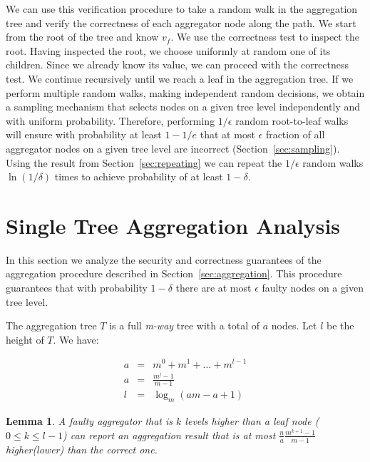 \documentclass{article}
\newtheorem{lem}[thm]{Lemma}
\begin{document}
We can use this verification procedure to take a random walk in the
aggregation tree and verify the correctness of each aggregator node
along the path. We start from the root of the tree and know $v_f$. We
use the correctness test to inspect  the root. Having inspected the
root, we choose uniformly at random one of its 
children. Since we already know its value, we can proceed with the
correctness test. We continue recursively until we reach a leaf in the
aggregation tree. If we perform multiple random walks, making
independent random decisions, we obtain a sampling mechanism that
selects nodes on a given tree level independently and with uniform
probability. Therefore, performing $1/\epsilon$ random root-to-leaf walks will
ensure with probability at least $1-1/e$ that at most $\epsilon$
fraction of all aggregator nodes on a given tree level are incorrect
(Section~\ref{sec:sampling}). Using the result from
Section~\ref{sec:repeating} we can repeat the $1/\epsilon$ random
walks $\ln(1/\delta)$ times to achieve probability of at least
$1-\delta$.  

\section{Single Tree Aggregation Analysis}
\label{sec:analysis}
In this section we analyze the security and correctness guarantees of
the aggregation procedure described in
Section~\ref{sec:aggregation}. This procedure guarantees that with
probability $1-\delta$ there are at most $\epsilon$ faulty nodes on a
given tree level.

The aggregation tree $T$ is a full \emph{m-way} tree with a total of
$a$ nodes. Let $l$ be the height of $T$. We have:

\begin{eqnarray*}
a &=& m^0 + m^1 + \ldots + m^{l-1}\\
a &=& \frac{m^l -1}{m-1}\\
l &=& \log_m(am-a+1)
\end{eqnarray*}


\begin{lem}\label{lem:offset}
A faulty aggregator that is $k$ levels higher than a leaf node ($0 \leq k
\leq l-1$) can report an aggregation result that is at most 
$\frac{n}{a}\frac{m^{k+1} -1}{m-1}$ higher(lower) than the correct one.  
\end{lem}
\end{document}
